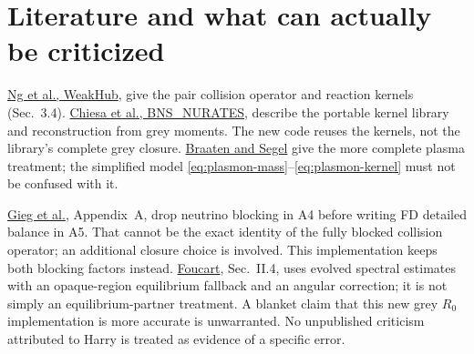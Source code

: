 \documentclass[11pt,a4paper]{article}
\begin{document}
\section{Literature and what can actually be criticized}

\href{https://arxiv.org/html/2309.03526v2}{Ng et al., WeakHub}, give the pair
collision operator and reaction kernels (Sec.~3.4).
\href{https://arxiv.org/html/2412.04570v2}{Chiesa et al., BNS\_NURATES},
describe the portable kernel library and reconstruction from grey moments.
The new code reuses the kernels, not the library's complete grey closure.
\href{https://arxiv.org/abs/hep-ph/9302213}{Braaten and Segel} give the more
complete plasma treatment; the simplified model
\eqref{eq:plasmon-mass}--\eqref{eq:plasmon-kernel} must not be confused with it.

\href{https://arxiv.org/html/2604.14225v2}{Gieg et al.}, Appendix~A, drop
neutrino blocking in A4 before writing FD detailed balance in A5. That cannot
be the exact identity of the fully blocked collision operator; an additional
closure choice is involved. This implementation keeps both blocking factors
instead. \href{https://arxiv.org/html/2606.27425v1}{Foucart}, Sec.~II.4, uses
evolved spectral estimates with an opaque-region equilibrium fallback and an
angular correction; it is not simply an equilibrium-partner treatment. A
blanket claim that this new grey $R_0$ implementation is more accurate is
unwarranted. No unpublished criticism attributed to Harry is treated as
evidence of a specific error.
\end{document}

